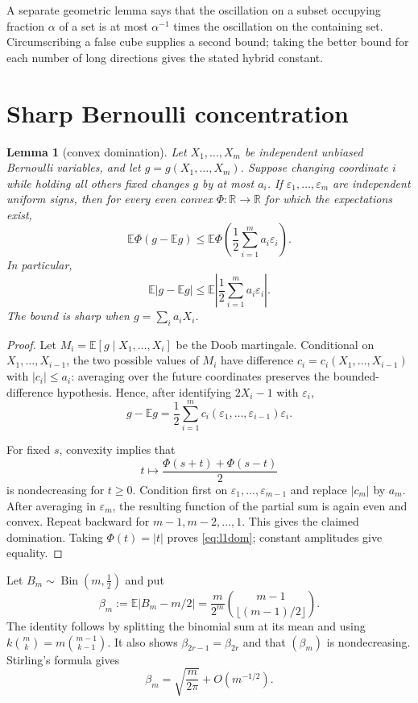 \documentclass[11pt]{article}
\newtheorem{lemma}{Lemma}
\newcommand{\E}{\mathbb E}
\begin{document}
A separate geometric lemma says that the oscillation on a subset occupying
fraction $\alpha$ of a set is at most $\alpha^{-1}$ times the oscillation on
the containing set.  Circumscribing a false cube supplies a second bound;
taking the better bound for each number of long directions gives the stated
hybrid constant.

\section{Sharp Bernoulli concentration}

\begin{lemma}[convex domination]\label{lem:convex}
Let $X_1,\dots,X_m$ be independent unbiased Bernoulli variables, and let
$g=g(X_1,\dots,X_m)$.  Suppose changing coordinate $i$ while holding all
others fixed changes $g$ by at most $a_i$.  If $\varepsilon_1,\dots,
\varepsilon_m$ are independent uniform signs, then for every even convex
$\Phi:\mathbb R\to\mathbb R$ for which the expectations exist,
\[
 \E\Phi(g-\E g)
 \le
 \E\Phi\!\left(\frac12\sum_{i=1}^m a_i\varepsilon_i\right).
\]
In particular,
\begin{equation}\label{eq:l1dom}
 \E|g-\E g|
 \le \E\left|\frac12\sum_{i=1}^m a_i\varepsilon_i\right|.
\end{equation}
The bound is sharp when $g=\sum_i a_iX_i$.
\end{lemma}

\begin{proof}
Let $M_i=\E[g\mid X_1,\dots,X_i]$ be the Doob martingale.  Conditional on
$X_1,\dots,X_{i-1}$, the two possible values of $M_i$ have difference
$c_i=c_i(X_1,\dots,X_{i-1})$ with $|c_i|\le a_i$: averaging over the future
coordinates preserves the bounded-difference hypothesis.  Hence, after
identifying $2X_i-1$ with $\varepsilon_i$,
\[
 g-\E g=\frac12\sum_{i=1}^m
 c_i(\varepsilon_1,\dots,\varepsilon_{i-1})\varepsilon_i.
\]

For fixed $s$, convexity implies that
\[
 t\longmapsto \frac{\Phi(s+t)+\Phi(s-t)}2
\]
is nondecreasing for $t\ge0$.  Condition first on
$\varepsilon_1,\dots,\varepsilon_{m-1}$ and replace $|c_m|$ by $a_m$.
After averaging in $\varepsilon_m$, the resulting function of the partial
sum is again even and convex.  Repeat backward for $m-1,m-2,\dots,1$.
This gives the claimed domination.  Taking $\Phi(t)=|t|$ proves
\eqref{eq:l1dom}; constant amplitudes give equality.
\end{proof}

Let $B_m\sim\operatorname{Bin}(m,\tfrac12)$ and put
\begin{equation}\label{eq:beta}
 \beta_m:=\E|B_m-m/2|
 =\frac{m}{2^m}\binom{m-1}{\lfloor(m-1)/2\rfloor}.
\end{equation}
The identity follows by splitting the binomial sum at its mean and using
$k\binom mk=m\binom{m-1}{k-1}$.  It also shows
$\beta_{2r-1}=\beta_{2r}$ and that $(\beta_m)$ is nondecreasing.  Stirling's
formula gives
\begin{equation}\label{eq:betaasymp}
 \beta_m=\sqrt{\frac{m}{2\pi}}+O(m^{-1/2}).
\end{equation}
\end{document}
